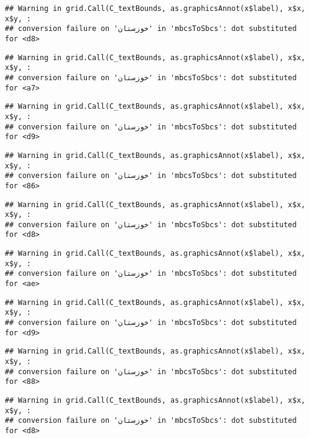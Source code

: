 \documentclass[
]{article}
\begin{document}
\begin{verbatim}
## Warning in grid.Call(C_textBounds, as.graphicsAnnot(x$label), x$x, x$y, :
## conversion failure on 'خوزستان' in 'mbcsToSbcs': dot substituted for <d8>
\end{verbatim}

\begin{verbatim}
## Warning in grid.Call(C_textBounds, as.graphicsAnnot(x$label), x$x, x$y, :
## conversion failure on 'خوزستان' in 'mbcsToSbcs': dot substituted for <a7>
\end{verbatim}

\begin{verbatim}
## Warning in grid.Call(C_textBounds, as.graphicsAnnot(x$label), x$x, x$y, :
## conversion failure on 'خوزستان' in 'mbcsToSbcs': dot substituted for <d9>
\end{verbatim}

\begin{verbatim}
## Warning in grid.Call(C_textBounds, as.graphicsAnnot(x$label), x$x, x$y, :
## conversion failure on 'خوزستان' in 'mbcsToSbcs': dot substituted for <86>
\end{verbatim}

\begin{verbatim}
## Warning in grid.Call(C_textBounds, as.graphicsAnnot(x$label), x$x, x$y, :
## conversion failure on 'خوزستان' in 'mbcsToSbcs': dot substituted for <d8>
\end{verbatim}

\begin{verbatim}
## Warning in grid.Call(C_textBounds, as.graphicsAnnot(x$label), x$x, x$y, :
## conversion failure on 'خوزستان' in 'mbcsToSbcs': dot substituted for <ae>
\end{verbatim}

\begin{verbatim}
## Warning in grid.Call(C_textBounds, as.graphicsAnnot(x$label), x$x, x$y, :
## conversion failure on 'خوزستان' in 'mbcsToSbcs': dot substituted for <d9>
\end{verbatim}

\begin{verbatim}
## Warning in grid.Call(C_textBounds, as.graphicsAnnot(x$label), x$x, x$y, :
## conversion failure on 'خوزستان' in 'mbcsToSbcs': dot substituted for <88>
\end{verbatim}

\begin{verbatim}
## Warning in grid.Call(C_textBounds, as.graphicsAnnot(x$label), x$x, x$y, :
## conversion failure on 'خوزستان' in 'mbcsToSbcs': dot substituted for <d8>
\end{verbatim}
\end{document}
